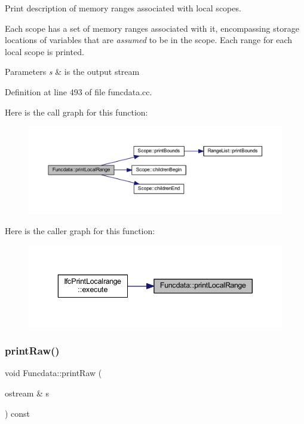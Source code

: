 Print description of memory ranges associated with local scopes. 

Each scope has a set of memory ranges associated with it, encompassing storage locations of variables that are {\itshape assumed} to be in the scope. Each range for each local scope is printed. 
\begin{DoxyParams}{Parameters}
{\em s} & is the output stream \\
\hline
\end{DoxyParams}


Definition at line 493 of file funcdata.\+cc.

Here is the call graph for this function\+:
\nopagebreak
\begin{figure}[H]
\begin{center}
\leavevmode
\includegraphics[width=350pt]{class_funcdata_a2b52d8ec8b53529b02881977971067ce_cgraph}
\end{center}
\end{figure}
Here is the caller graph for this function\+:
\nopagebreak
\begin{figure}[H]
\begin{center}
\leavevmode
\includegraphics[width=343pt]{class_funcdata_a2b52d8ec8b53529b02881977971067ce_icgraph}
\end{center}
\end{figure}
\mbox{\label{class_funcdata_a9a3cdbf385c382c10fc5b48f5842b418}} 
\subsubsection{\texorpdfstring{printRaw()}{printRaw()}}
{\footnotesize\ttfamily void Funcdata\+::print\+Raw (\begin{DoxyParamCaption}\item[{ostream \&}]{s }\end{DoxyParamCaption}) const}



